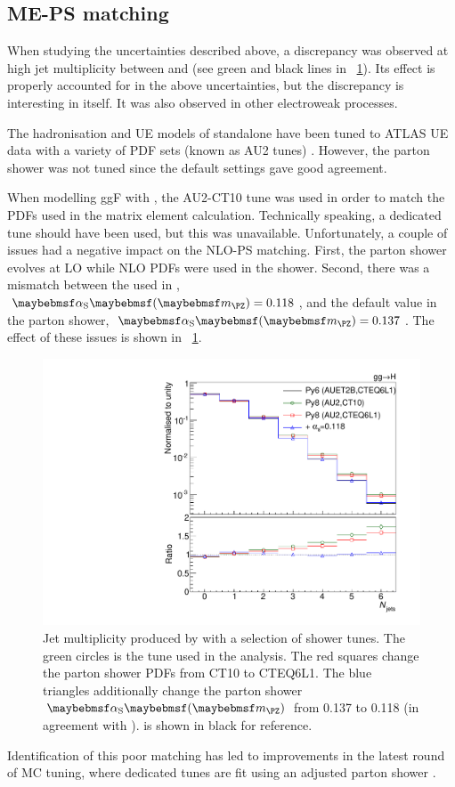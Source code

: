 \subsection{ME-PS matching}
\label{sec:ggF:meps_matching}

When studying the uncertainties described above, a discrepancy was observed at high jet 
multiplicity between  and  (see 
green and black lines in \Figure~\ref{fig:signal:matching}). Its effect is properly 
accounted for in the above uncertainties, but the discrepancy is interesting in itself.
It was also observed in other electroweak processes.

The hadronisation and \ac{UE} models of standalone  have been tuned to ATLAS 
\ac{UE} data with a variety of \ac{PDF} sets (known as AU2 tunes) \cite{ATLAS:tune:2012}.
However, the parton shower was not tuned since the default settings gave good agreement. 

When modelling ggF with \powhegbox, the AU2-CT10 tune was used in order to match the 
\acp{PDF} used in the matrix element calculation. Technically speaking, a dedicated 
 tune should have been used, but this was unavailable. 
Unfortunately, a couple of issues had a negative impact on the NLO-PS matching. First, 
the parton shower evolves \alphaS at LO while NLO \acp{PDF} were used in the shower. 
Second, there was a mismatch between the \alphaS used in \powhegbox, 
$\alphaS\parenths{\mZ} = 0.118$, and the default value in the parton shower, 
$\alphaS\parenths{\mZ} = 0.137$. The effect of these issues is shown in 
\Figure~\ref{fig:signal:matching}.

\begin{figure}
	\includegraphics[width=\smallfigwidth]{tex/signal/matching}
	\caption{Jet multiplicity produced by  with a selection 
	of shower tunes. The green circles is the tune used in the analysis. The red squares 
	change the parton shower PDFs from CT10 to CTEQ6L1. The blue triangles additionally 
	change the parton shower $\alphaS\parenths{\mZ}$ from 0.137 to 0.118 (in agreement 
	with \powhegbox).  is shown in black for reference.}
	\label{fig:signal:matching}
\end{figure}

Identification of this poor matching has led to improvements in the latest round of MC 
tuning, where dedicated  tunes are fit using an adjusted 
parton shower \cite{ATLAS:tune:2013}.
